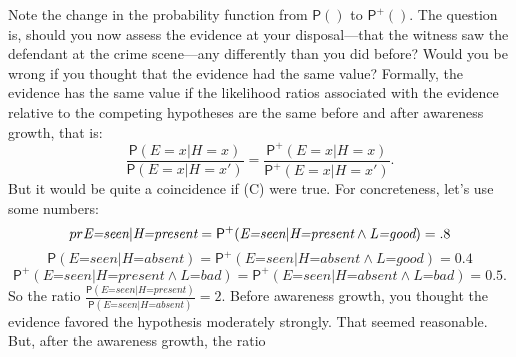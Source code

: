 \documentclass[
  11pt,
  dvipsnames,enabledeprecatedfontcommands]{scrartcl}
\newcommand{\pr}[1]{\ensuremath{\mathsf{P}(#1)}}
\newcommand{\ppr}[2]{\ensuremath{\mathsf{P}^{#1}(#2)}}
\begin{document}
Note the change in the probability function from \(\pr{}\) to
\(\ppr{+}{}\). The question is, should you now assess the evidence at
your disposal---that the witness saw the defendant at the crime
scene---any differently than you did before? Would you be wrong if you
thought that the evidence had the same value? Formally, the evidence has
the same value if the likelihood ratios associated with the evidence
relative to the competing hypotheses are the same before and after
awareness growth, that is:
\[\frac{\pr{E=x \vert H=x}}{\pr{E=x \vert H=x'}}= \frac{\ppr{+}{E=x \vert H=x}}{\ppr{+}{E=x \vert H=x'}} \tag{C}.\]
But it would be quite a coincidence if (C) were true. For concreteness,
let's use some numbers:
\[\\pr{\textit{E=seen} \vert \textit{H=present}}=\ppr{+}{\textit{E=seen} \vert \textit{H=present} \wedge \textit{L=good}}=.8\]
\[\pr{\textit{E=seen} \vert \textit{H=absent}}=\ppr{+}{\textit{E=seen} \vert \textit{H=absent} \wedge \textit{L=good}}=0.4\]
\[\ppr{+}{\textit{E=seen} \vert \textit{H=present} \wedge \textit{L=bad}} = \ppr{+}{\textit{E=seen} \vert \textit{H=absent} \wedge \textit{L=bad}}=0.5.\]
So the ratio
\(\frac{\pr{\textit{E=seen} \vert \textit{H=present}}}{\pr{\textit{E=seen} \vert \textit{H=absent}}}=2\).
Before awareness growth, you thought the evidence favored the hypothesis
moderately strongly. That seemed reasonable. But, after the awareness
growth, the ratio
\end{document}
